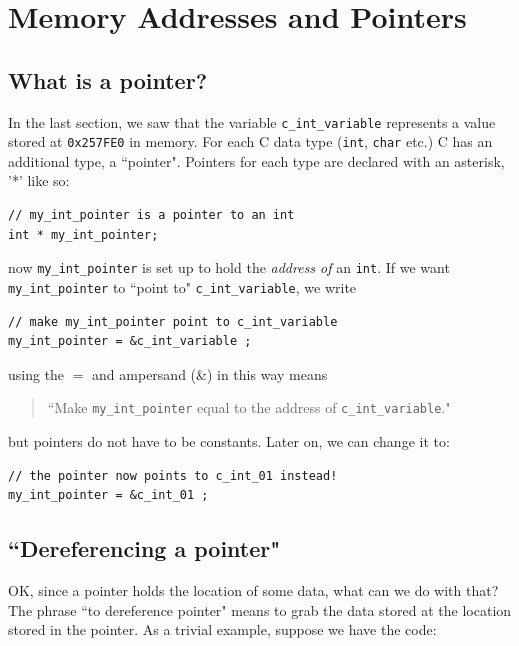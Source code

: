 %

\section{Memory Addresses and Pointers}
\subsection{What is a pointer?}
In the last section, we saw that the variable {\tt c\_int\_variable} 
represents a value stored at {\tt 0x257FE0} in memory.   For each 
C data type ({\tt int}, {\tt char} etc.) C has an additional type,
a ``pointer".  Pointers for each type are declared with an asterisk, '*'
like so:
\begin{verbatim}
// my_int_pointer is a pointer to an int
int * my_int_pointer; 
\end{verbatim}
now {\tt my\_int\_pointer} is set up to hold the {\it address of} an {\tt int}.
If we want {\tt my\_int\_pointer} to ``point to" {\tt c\_int\_variable}, we write

%

\begin{verbatim}
// make my_int_pointer point to c_int_variable
my_int_pointer = &c_int_variable ;  
\end{verbatim}
using the $=$ and ampersand (\&) in this way means 
\begin{quotation} 
   ``Make {\tt my\_int\_pointer} equal to the address of {\tt c\_int\_variable}."
\end{quotation}
but pointers do not have to be constants.   Later on, we can change it to:

\begin{verbatim}
// the pointer now points to c_int_01 instead!
my_int_pointer = &c_int_01 ;  
\end{verbatim}


%


\subsection{``Dereferencing a pointer"}
OK, since a pointer holds the location of some data, what can we do with that?   The phrase 
``to dereference pointer" means to grab the data stored at the location stored in the pointer. 
As a trivial example, suppose we have the code:

